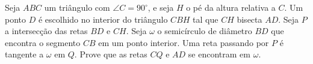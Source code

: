 Seja $ABC$ um triângulo com $\angle{C} = 90^{\circ}$, e seja $H$ o pé da altura relativa a $C$.
Um ponto $D$ é escolhido no interior do triângulo $CBH$ tal que $CH$ bisecta $AD$.
Seja $P$ a intersecção das retas $BD$ e $CH$.
Seja $\omega$ o semicírculo de diâmetro $BD$ que encontra o segmento $CB$ em um ponto interior.
Uma reta passando por $P$ é tangente a $\omega$ em $Q$.
Prove que as retas $CQ$ e $AD$ se encontram em $\omega$.
